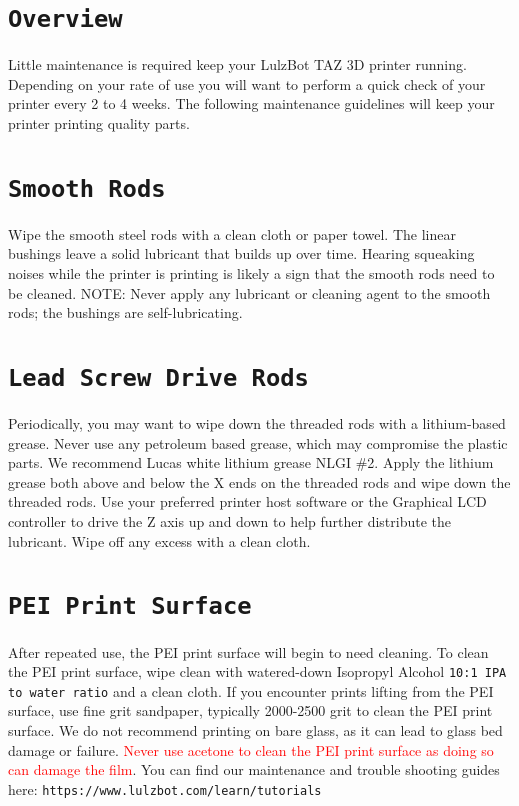 %
%
%
%
%

\section{\texttt{Overview}}
Little maintenance is required keep your LulzBot\textsuperscript{\miniscule{\textregistered}} TAZ 3D printer running. Depending on your rate of use you will want to perform a quick check of your printer every 2 to 4 weeks. The following maintenance guidelines will keep your printer printing quality parts.

\section{\texttt{Smooth Rods}}
Wipe the smooth steel rods with a clean cloth or paper towel. The linear bushings leave a solid lubricant that builds up over time. Hearing squeaking noises while the printer is printing is likely a sign that the smooth rods need to be cleaned. NOTE: Never apply any lubricant or cleaning agent to the smooth rods; the bushings are self-lubricating.

\section{\texttt{Lead Screw Drive Rods}}
Periodically, you may want to wipe down the threaded rods with a lithium-based grease. Never use any petroleum based grease, which may compromise the plastic parts. We recommend Lucas white lithium grease NLGI \#2. Apply the lithium grease both above and below the X ends on the threaded rods and wipe down the threaded rods. Use your preferred printer host software or the Graphical LCD controller to drive the Z axis up and down to help further distribute the lubricant. Wipe off any excess with a clean cloth.

\section{\texttt{PEI Print Surface}}
After repeated use, the PEI print surface will begin to need cleaning. To clean the PEI print surface, wipe clean with watered-down Isopropyl Alcohol \texttt{10:1 IPA to water ratio} and a clean cloth. If you encounter prints lifting from the PEI surface, use fine grit sandpaper, typically 2000-2500 grit to clean the PEI print surface. We do not recommend printing on bare glass, as it can lead to glass bed damage or failure. \textcolor{red}{Never use acetone to clean the PEI print surface as doing so can damage the film}. You can find our maintenance and trouble shooting guides here:
\texttt{https://www.lulzbot.com/learn/tutorials}

